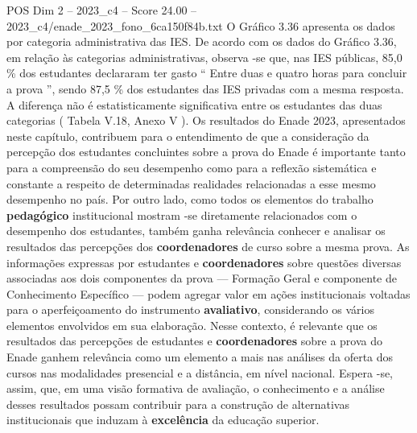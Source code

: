 \begin{textsample}{POS Dim 2 – 2023\_c4 – Score 24.00 – 2023\_c4/enade\_2023\_fono\_6ca150f84b.txt}
O Gráfico 3.36 apresenta os dados por categoria administrativa das IES.
De acordo com os dados do Gráfico 3.36, em relação às categorias administrativas, observa -se que, nas IES públicas, 85,0 \% dos estudantes declararam ter gasto “ Entre duas e quatro horas para concluir a prova ”, sendo 87,5 \% dos estudantes das IES privadas com a mesma resposta.
A diferença não é estatisticamente significativa entre os estudantes das duas categorias ( Tabela V.18, Anexo V ).
Os resultados do Enade 2023, apresentados neste capítulo, contribuem para o entendimento de que a consideração da percepção dos estudantes concluintes sobre a prova do Enade é importante tanto para a compreensão do seu desempenho como para a reflexão sistemática e constante a respeito de determinadas realidades relacionadas a esse mesmo desempenho no país.
Por outro lado, como todos os elementos do trabalho \textbf{pedagógico} institucional mostram -se diretamente relacionados com o desempenho dos estudantes, também ganha relevância conhecer e analisar os resultados das percepções dos \textbf{coordenadores} de curso sobre a mesma prova.
As informações expressas por estudantes e \textbf{coordenadores} sobre questões diversas associadas aos dois componentes da prova — Formação Geral e componente de Conhecimento Específico — podem agregar valor em ações institucionais voltadas para o aperfeiçoamento do instrumento \textbf{avaliativo}, considerando os vários elementos envolvidos em sua elaboração.
Nesse contexto, é relevante que os resultados das percepções de estudantes e \textbf{coordenadores} sobre a prova do Enade ganhem relevância como um elemento a mais nas análises da oferta dos cursos nas modalidades presencial e a distância, em nível nacional.
Espera -se, assim, que, em uma visão formativa de avaliação, o conhecimento e a análise desses resultados possam contribuir para a construção de alternativas institucionais que induzam à \textbf{excelência} da educação superior.

\end{textsample}
